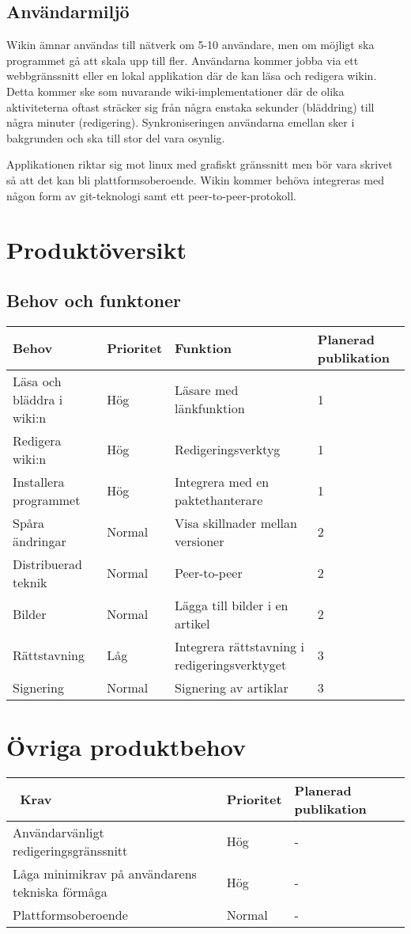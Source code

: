 \subsection{Användarmiljö}
Wikin ämnar användas till nätverk om 5-10 användare, men om möjligt ska programmet gå att skala upp till fler. Användarna kommer jobba via ett webbgränssnitt eller en lokal applikation där de kan läsa och redigera wikin. Detta kommer ske som nuvarande wiki-implementationer där de olika aktiviteterna oftast sträcker sig från några enstaka sekunder (bläddring) till några minuter (redigering). Synkroniseringen användarna emellan sker i bakgrunden och ska till stor del vara osynlig.

Applikationen riktar sig mot linux med grafiskt gränssnitt men bör vara skrivet så att det kan bli plattformsoberoende. Wikin kommer behöva integreras med någon form av git-teknologi samt ett peer-to-peer-protokoll.
\section{Produktöversikt}
\subsection*{Behov och funktoner}
\begin{tabular}{|l|l|l|l|}
\hline
Behov & Prioritet & Funktion & Planerad publikation \\
\hline
Läsa och bläddra i wiki:n & Hög & Läsare med länkfunktion & 1 \\
\hline
Redigera wiki:n & Hög & Redigeringsverktyg & 1 \\
\hline
Installera programmet & Hög & Integrera med en paktethanterare & 1 \\
\hline
Spåra ändringar & Normal & Visa skillnader mellan versioner & 2 \\
\hline
Distribuerad teknik & Normal & Peer-to-peer & 2 \\
\hline 
Bilder & Normal & Lägga till bilder i en artikel & 2 \\
\hline
Rättstavning & Låg & Integrera rättstavning i redigeringsverktyget & 3 \\
\hline
Signering & Normal & Signering av artiklar & 3 \\
\hline
\end{tabular}
\section{Övriga produktbehov}
\begin{tabular}{|l|l|l|}
\hline\
Krav & Prioritet & Planerad publikation \\
\hline
Användarvänligt redigeringsgränssnitt & Hög & - \\
\hline
Låga minimikrav på användarens tekniska förmåga & Hög & - \\
\hline
Plattformsoberoende & Normal & - \\
\hline
\end{tabular}

